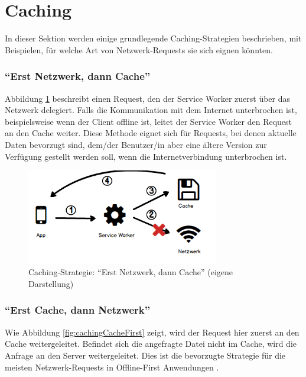 \documentclass[a4paper, 12pt]{scrreprt}
\begin{document}
\section{Caching}
In dieser Sektion werden einige grundlegende Caching-Strategien beschrieben, mit Beispielen, für welche Art von Netzwerk-Requests sie sich eignen könnten.

\subsubsection{\enquote{Erst Netzwerk, dann Cache}}
Abbildung \ref{fig:cachingNetworkFirst} beschreibt einen Request, den der Service Worker zuerst über das Netzwerk delegiert. Falls die Kommunikation mit dem Internet unterbrochen ist, beispielsweise wenn der Client offline ist, leitet der Service Worker den Request an den Cache weiter. Diese Methode eignet sich für Requests, bei denen aktuelle Daten bevorzugt sind, dem/der Benutzer/in aber eine ältere Version zur Verfügung gestellt werden soll, wenn die Internetverbindung unterbrochen ist.

\begin{figure}[H]
	\centering
	\includegraphics[width=0.75\textwidth]{networkfirst.png}
	\caption[Caching-Strategie: \enquote{Erst Netzwerk, dann Cache}]{Caching-Strategie: \enquote{Erst Netzwerk, dann Cache} (eigene Darstellung)}
	\label{fig:cachingNetworkFirst}
\end{figure}



\subsubsection{\enquote{Erst Cache, dann Netzwerk}}
\label{sec:cachedannnetzwerk}
Wie Abbildung \ref{fig:cachingCacheFirst} zeigt, wird der Request hier zuerst an den Cache weitergeleitet. Befindet sich die angefragte Datei nicht im Cache, wird die Anfrage an den Server weitergeleitet. Dies ist die bevorzugte Strategie für die meisten Netzwerk-Requests in Offline-First Anwendungen \autocite[Kapitel 05]{BookBuildingPWAs}.
\end{document}
